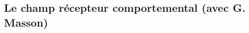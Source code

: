 \documentclass[11pt,french,a4paper,oneside]{article}%
\begin{document}

\subsection{Le champ récepteur comportemental (avec G. Masson)}

\end{document}
